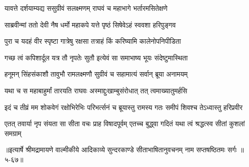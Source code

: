 \twolineshloka
{यावत्ते दर्शयाम्यद्य ससुग्रीवं सलक्ष्मणम्}
{राघवं च महाभागे भर्तारमसितेक्षणे} %

\twolineshloka
{साब्रवीन्मां ततो देवी नैष धर्मो महाकपे}
{यत्ते पृष्ठं सिषेवेऽहं स्ववशा हरिपुङ्गव} %

\twolineshloka
{पुरा च यदहं वीर स्पृष्टा गात्रेषु रक्षसा}
{तत्राहं किं करिष्यामि कालेनोपनिपीडिता} %

\twolineshloka
{गच्छ त्वं कपिशार्दूल यत्र तौ नृपतेः सुतौ}
{इत्येवं सा समाभाष्य भूयः संदेष्टुमास्थिता} %

\twolineshloka
{हनूमन् सिंहसंकाशौ तावुभौ रामलक्ष्मणौ}
{सुग्रीवं च सहामात्यं सर्वान् ब्रूया अनामयम्} %

\twolineshloka
{यथा च स महाबाहुर्मां तारयति राघवः}
{अस्माद्दुःखाम्बुसंरोधात् तत् त्वमाख्यातुमर्हसि} %

\twolineshloka
{इदं च तीव्रं मम शोकवेगं रक्षोभिरेभिः परिभर्त्सनं च}
{ब्रूयास्तु रामस्य गतः समीपं शिवश्च तेऽध्वास्तु हरिप्रवीर} %

\twolineshloka
{एतत् तवार्या नृप संयता सा सीता वचः प्राह विषादपूर्वम्}
{एतच्च बुद्ध्वा गदितं यथा त्वं श्रद्धत्स्व सीतां कुशलां समग्राम्} %


॥इत्यार्षे श्रीमद्रामायणे वाल्मीकीये आदिकाव्ये सुन्दरकाण्डे सीताभाषितानुवचनम् नाम सप्तषष्ठितमः सर्गः ॥५-६७॥
